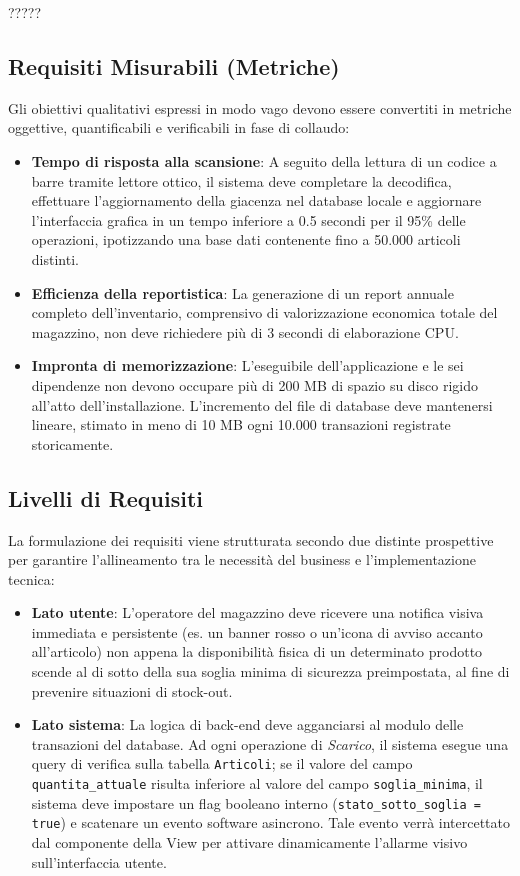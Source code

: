 \documentclass[a4paper,12pt]{article}
\begin{document}
	?????
	\subsection{Requisiti Misurabili (Metriche)}
	Gli obiettivi qualitativi espressi in modo vago devono essere convertiti in metriche oggettive, quantificabili e verificabili in fase di collaudo:
	\begin{itemize}
		\item \textbf{Tempo di risposta alla scansione}: A seguito della lettura di un codice a barre tramite lettore ottico, il sistema deve completare la decodifica, effettuare l'aggiornamento della
		giacenza nel database locale e aggiornare l'interfaccia grafica in un tempo inferiore a 0.5 secondi per il 95\% delle operazioni, ipotizzando una base dati contenente fino a 50.000 articoli 
		distinti.
		\item \textbf{Efficienza della reportistica}: La generazione di un report annuale completo dell'inventario, comprensivo di valorizzazione economica totale del magazzino, non deve richiedere 
		più di 3 secondi di elaborazione CPU.
		\item \textbf{Impronta di memorizzazione}: L'eseguibile dell'applicazione e le sei dipendenze non devono occupare più di 200 MB di spazio su disco rigido all'atto dell'installazione. 
		L'incremento del file di database deve mantenersi lineare, stimato in meno di 10 MB ogni 10.000 transazioni registrate storicamente.
	\end{itemize}
	
	\subsection{Livelli di Requisiti}
	La formulazione dei requisiti viene strutturata secondo due distinte prospettive per garantire l'allineamento tra le necessità del business e l'implementazione tecnica:
	\begin{itemize}
		\item \textbf{Lato utente}: L'operatore del magazzino deve ricevere una notifica visiva immediata e persistente (es. un banner rosso o un'icona di avviso accanto all'articolo) non appena 
		la disponibilità fisica di un determinato prodotto scende al di sotto della sua soglia minima di sicurezza preimpostata, al fine di prevenire situazioni di stock-out.
		\item \textbf{Lato sistema}: La logica di back-end deve agganciarsi al modulo delle transazioni del database. Ad ogni operazione di \textit{Scarico}, il sistema esegue una query di verifica 
		sulla tabella \texttt{Articoli}; se il valore del campo \texttt{quantita\_attuale} risulta inferiore al valore del campo \texttt{soglia\_minima}, il sistema deve impostare un flag booleano 
		interno (\texttt{stato\_sotto\_soglia = true}) e scatenare un evento software asincrono. Tale evento verrà intercettato dal componente della View per attivare dinamicamente l'allarme visivo 
		sull'interfaccia utente.
	\end{itemize}
	
\end{document}
